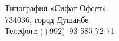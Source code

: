 \clearpage
\thispagestyle{empty}

~\\

\vfill

\pagebreak

\clearpage
\thispagestyle{empty}

{\setlength{\parindent}{0cm} 

~\\

\vfill

Типография «Сифат-Офсет»\\
734036, город Душанбе\\
Телефон: (+992)~93-585-72-71
}